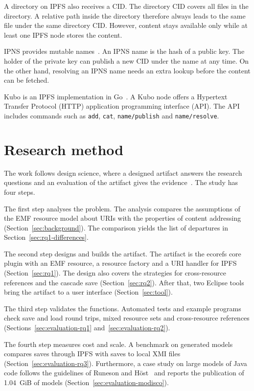 \documentclass[iicol,pdflatex,sn-mathphys-num]{sn-jnl}
\theoremstyle{thmstylethree}%
\begin{document}
A directory on IPFS also receives a CID. The directory CID covers all files in the directory. A relative path inside the directory therefore always leads to the same file under the same directory CID. However, content stays available only while at least one IPFS node stores the content.

IPNS provides mutable names~\cite{ipfsdocsipns}. An IPNS name is the hash of a public key. The holder of the private key can publish a new CID under the name at any time. On the other hand, resolving an IPNS name needs an extra lookup before the content can be fetched.

Kubo is an IPFS implementation in Go~\cite{kubo}. A Kubo node offers a Hypertext Transfer Protocol (HTTP) application programming interface (API). The API includes commands such as \texttt{add}, \texttt{cat}, \texttt{name/publish} and \texttt{name/resolve}.

\section{Research method}\label{sec:method}

The work follows design science, where a designed artifact answers the research questions and an evaluation of the artifact gives the evidence~\cite{hevner2004design}. The study has four steps.

The first step analyses the problem. The analysis compares the assumptions of the EMF resource model about URIs with the properties of content addressing (Section~\ref{sec:background}). The comparison yields the list of departures in Section~\ref{sec:rq1-differences}.

The second step designs and builds the artifact. The artifact is the ecorefs core plugin with an EMF resource, a resource factory and a URI handler for IPFS (Section~\ref{sec:rq1}). The design also covers the strategies for cross-resource references and the cascade save (Section~\ref{sec:rq2}). After that, two Eclipse tools bring the artifact to a user interface (Section~\ref{sec:tool}).

The third step validates the functions. Automated tests and example programs check save and load round trips, mixed resource sets and cross-resource references (Sections~\ref{sec:evaluation-rq1} and~\ref{sec:evaluation-rq2}).

The fourth step measures cost and scale. A benchmark on generated models compares saves through IPFS with saves to local XMI files (Section~\ref{sec:evaluation-rq3}). Furthermore, a case study on large models of Java code follows the guidelines of Runeson and H\"ost~\cite{runeson2009case} and reports the publication of 1.04~GiB of models (Section~\ref{sec:evaluation-modisco}).
\end{document}
